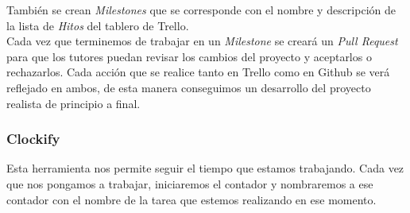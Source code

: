 También se crean \textit{Milestones} que se corresponde con el nombre y descripción de la lista de \textit{Hitos} del tablero de Trello.\\

Cada vez que terminemos de trabajar en un \textit{Milestone} se creará un \textit{Pull Request} para que los tutores puedan revisar los cambios del proyecto y aceptarlos o rechazarlos. Cada acción que se realice tanto en Trello como en Github se verá reflejado en ambos, de esta manera conseguimos un desarrollo del proyecto realista de principio a final.

\subsubsection{Clockify}

Esta herramienta nos permite seguir el tiempo que estamos trabajando. Cada vez que nos pongamos a trabajar, iniciaremos el contador y nombraremos a ese contador con el nombre de la tarea que estemos realizando en ese momento.






